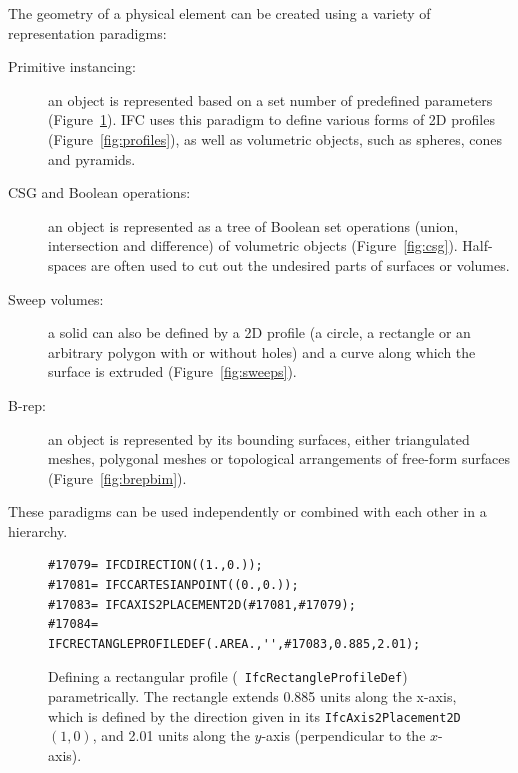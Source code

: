 The geometry of a physical element can be created using a variety of representation paradigms:
\begin{description}
  \item[Primitive instancing:] an object is represented based on a set number of predefined parameters (Figure~\ref{fig:parametric}).
  IFC uses this paradigm to define various forms of 2D profiles (Figure~\ref{fig:profiles}), as well as volumetric objects, such as spheres, cones and pyramids.
  \item[CSG and Boolean operations:] an object is represented as a tree of Boolean set operations (union, intersection and difference) of volumetric objects (Figure~\ref{fig:csg}).
  Half-spaces are often used to cut out the undesired parts of surfaces or volumes.
  \item[Sweep volumes:] a solid can also be defined by a 2D profile (a circle, a rectangle or an arbitrary polygon with or without holes) and a curve along which the surface is extruded (Figure~\ref{fig:sweeps}).
  \item[B-rep:] an object is represented by its bounding surfaces, either triangulated meshes, polygonal meshes or topological arrangements of free-form surfaces (Figure~\ref{fig:brepbim}).
\end{description}
These paradigms can be used independently or combined with each other in a hierarchy.

\begin{figure}[htbp]
\begin{lstlisting}[frame=single]
#17079= IFCDIRECTION((1.,0.));
#17081= IFCCARTESIANPOINT((0.,0.));
#17083= IFCAXIS2PLACEMENT2D(#17081,#17079);
#17084= IFCRECTANGLEPROFILEDEF(.AREA.,'',#17083,0.885,2.01);
\end{lstlisting}
\caption[Defining a rectangular profile parametrically]{Defining a rectangular profile (\ie\ \texttt{IfcRectangleProfileDef}) parametrically.
The rectangle extends 0.885 units along the x-axis, which is defined by the direction given in its \texttt{IfcAxis2Placement2D} \((1,0)\), and 2.01 units along the \(y\)-axis (perpendicular to the \(x\)-axis).}%
\label{fig:parametric}
\end{figure}

